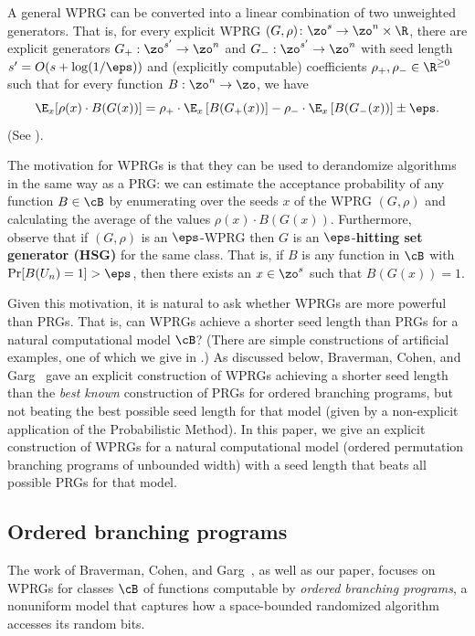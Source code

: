 \documentclass{toc}
\begin{document}
A general WPRG can be converted into a linear combination of two unweighted generators. That is, for every explicit WPRG 
$(G,\rho) \colon \zo^s \to \zo^n\times \R$, there are 
explicit generators $G_+ : \zo^{s'}\rightarrow \zo^n$ and $G_- : \zo^{s'}\rightarrow \zo^n$ with seed length
$s'=O(s+\log(1/\eps))$ and (explicitly computable) coefficients $\rho_+,\rho_-\in \R^{\geq 0}$ such that for every function $B : \zo^n\rightarrow \zo$, we have %
$$\E_x[\rho(x)\cdot B(G(x))] = 
\rho_+\cdot \E_x\left[B(G_+(x))\right] - \rho_-\cdot \E_x\left[B(G_-(x))\right]\pm \eps.$$
(See ).

The motivation for WPRGs is that they can be used to derandomize algorithms in the same way as a PRG:
we can estimate the acceptance probability of any function $B\in \cB$ by enumerating over the seeds $x$ of the WPRG $(G,\rho)$ and calculating the average of the values $\rho(x)\cdot B(G(x))$.
Furthermore, ~\cite{BravermanCoGa18} observe that if $(G,\rho)$ is an $\eps$-WPRG then $G$ is an $\eps$-\textbf{hitting set generator (HSG)} for the same class.  That is, if $B$ is any function in $\cB$ with $\Pr[B(U_n)=1]>\eps$, then there exists an $x\in \zo^s$ such that $B(G(x))=1$.

Given this motivation, it is natural to ask whether WPRGs are more powerful than PRGs.  That is, can WPRGs achieve a shorter seed length than PRGs for a natural computational model $\cB$?  (There are simple constructions of artificial examples, one of which we give in .) 
As discussed below, Braverman, Cohen, and Garg~\cite{BravermanCoGa18} gave an explicit construction of WPRGs achieving a shorter seed length than the \emph{best known} construction of PRGs for ordered branching programs, but not beating the best possible seed length for that model (given by a non-explicit application of the Probabilistic Method). In this %
paper,  %
we give an explicit construction of WPRGs for a natural computational model (ordered permutation branching programs of unbounded width) with a
seed length that beats all possible PRGs for that model. 


\subsection{Ordered branching programs}

    The work of Braverman, Cohen, and Garg~\cite{BravermanCoGa18}, as well as our paper, focuses
    on WPRGs for classes $\cB$ of functions computable by \emph{ordered branching programs}, a nonuniform model that captures how a space-bounded randomized algorithm accesses its random bits.
	
\end{document}
